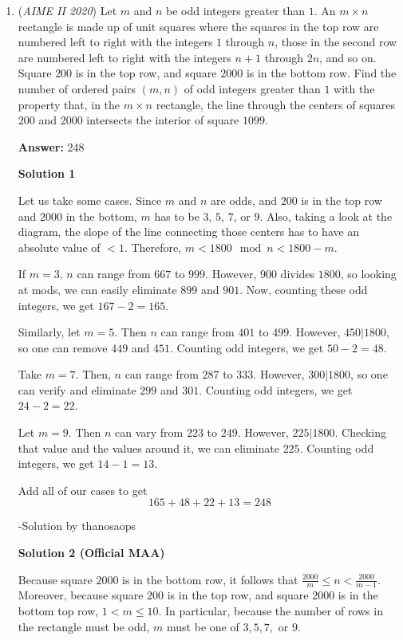 \begin{enumerate}
 Another one:

 


	\item (\textit{AIME II 2020}) Let $m$ and $n$ be odd integers greater than $1.$ An $m\times n$ rectangle is made up of unit squares where the squares in the top row are numbered left to right with the integers $1$ through $n$, those in the second row are numbered left to right with the integers $n + 1$ through $2n$, and so on. Square $200$ is in the top row, and square $2000$ is in the bottom row. Find the number of ordered pairs $(m,n)$ of odd integers greater than $1$ with the property that, in the $m\times n$ rectangle, the line through the centers of squares $200$ and $2000$ intersects the interior of square $1099$.


 
 \textbf{Answer: }248



\textbf{Solution 1}

Let us take some cases. Since $m$ and $n$ are odds, and $200$ is in the top row and $2000$ in the bottom, $m$ has to be $3$, $5$, $7$, or $9$. Also, taking a look at the diagram, the slope of the line connecting those centers has to have an absolute value of $< 1$. Therefore, $m < 1800 \mod n < 1800-m$. 

 If $m=3$, $n$ can range from $667$ to $999$. However, $900$ divides $1800$, so looking at mods, we can easily eliminate $899$ and $901$. Now, counting these odd integers, we get $167 - 2 = 165$.

 Similarly, let $m=5$. Then $n$ can range from $401$ to $499$. However, $450|1800$, so one can remove $449$ and $451$. Counting odd integers, we get $50 - 2 = 48$.

 Take $m=7$. Then, $n$ can range from $287$ to $333$. However, $300|1800$, so one can verify and eliminate $299$ and $301$. Counting odd integers, we get $24 - 2 = 22$.

 Let $m = 9$. Then $n$ can vary from $223$ to $249$. However, $225|1800$. Checking that value and the values around it, we can eliminate $225$. Counting odd integers, we get $14 - 1 = 13$.

 Add all of our cases to get 
 \[165+48+22+13 = \boxed{248}\]

 -Solution by thanosaops

 



\textbf{Solution 2 (Official MAA)}

Because square $2000$ is in the bottom row, it follows that $\frac{2000}m \le n < \frac{2000}{m-1}$. Moreover, because square $200$ is in the top row, and square $2000$ is in the bottom top row, $1 < m \le 10$. In particular, because the number of rows in the rectangle must be odd, $m$ must be one of $3, 5, 7,$ or $9.$


\end{enumerate}
